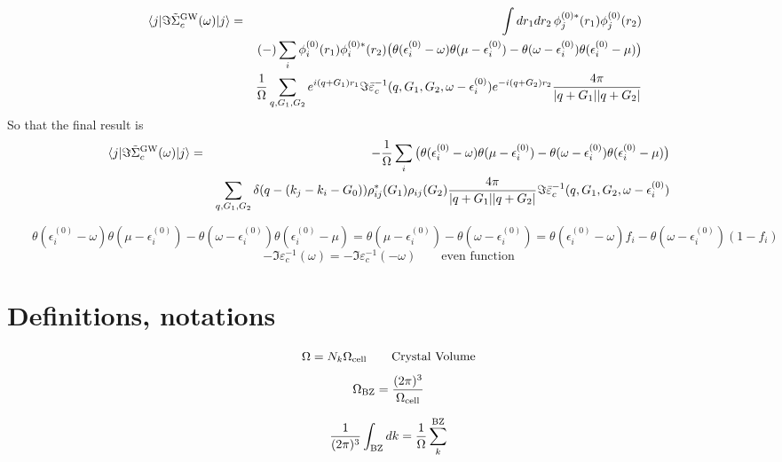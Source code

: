 \documentclass[fleqn]{article}
\begin{document}
\begin{eqnarray*}
  \quad
  \langle j | \Im \tilde{\Sigma}^{\rm GW}_c(\omega) | j \rangle
  &=& \int dr_1 dr_2 \, \phi_j^{(0)*}(r_1) \phi_j^{(0)}(r_2) 
  \\ && (-) \sum_i \phi_i^{(0)}(r_1) \phi_i^{(0)*}(r_2) 
  \big( \theta(\epsilon_i^{(0)}-\omega) \theta(\mu-\epsilon_i^{(0)}) 
  - \theta(\omega-\epsilon_i^{(0)}) \theta(\epsilon_i^{(0)}-\mu) \big)
  \\ &&
      \frac{1}{\Omega} \sum_{q,G_1,G_2} 
      e^{i(q+G_1)r_1} \Im \bar\varepsilon^{-1}_c(q,G_1,G_2,\omega-\epsilon_i^{(0)}) e^{-i(q+G_2)r_2}
      \frac{4\pi}{|q+G_1||q+G_2|}  
\end{eqnarray*}
So that the final result is
\begin{eqnarray*}
  \langle j | \Im \tilde{\Sigma}^{\rm GW}_c(\omega) | j \rangle &=&
  - \frac{1}{\Omega} \sum_i   \big( \theta(\epsilon_i^{(0)}-\omega) \theta(\mu-\epsilon_i^{(0)}) 
  - \theta(\omega-\epsilon_i^{(0)}) \theta(\epsilon_i^{(0)}-\mu) \big)
  \\ &&
  \sum_{q,G_1,G_2} \delta(q - (k_j-k_i-G_0))
  \rho^*_{ij}(G_1) \rho_{ij}(G_2) \frac{4\pi}{|q+G_1||q+G_2|}
  \Im \bar\varepsilon^{-1}_c(q,G_1,G_2,\omega-\epsilon_i^{(0)})
\end{eqnarray*}

\[
  \qquad
  \theta(\epsilon_i^{(0)}-\omega) \theta(\mu-\epsilon_i^{(0)}) 
  - \theta(\omega-\epsilon_i^{(0)}) \theta(\epsilon_i^{(0)}-\mu) =
  \theta(\mu-\epsilon_i^{(0)}) - \theta(\omega-\epsilon_i^{(0)}) =
  \theta(\epsilon_i^{(0)}-\omega) f_i - \theta(\omega-\epsilon_i^{(0)}) (1- f_i) 
\]
\[
  - \Im  \varepsilon_c^{-1}(\omega) = -\Im \varepsilon_c^{-1}(-\omega)
  \qquad\textrm{even function}
\]

\appendix


\section{Definitions, notations}

\[
\Omega = N_k \Omega_{\rm cell} \qquad \textrm{Crystal Volume}
\]
\[
\Omega_{\rm BZ} = \frac{(2\pi)^3}{\Omega_{\rm cell}}
\]

\[
\frac{1}{(2 \pi)^3} \int_{\rm BZ} dk = \frac{1}{\Omega} \sum_k^{\rm BZ}
\]
\end{document}
